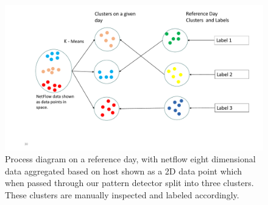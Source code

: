  \begin{figure}[b]
	\centerline{\includegraphics[scale = 0.5]{assign_prob.pdf}}
	\caption{Process diagram on a reference day, with netflow eight dimensional data aggregated based on host shown as a 2D data point which when passed through our pattern detector split into three clusters. These clusters are manually inspected and labeled accordingly. }%
\end{figure}
